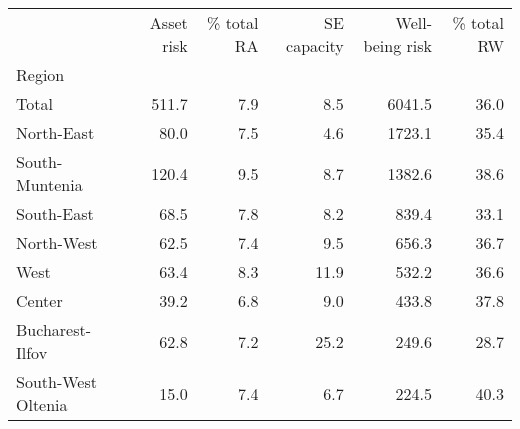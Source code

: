 \begin{tabular}{lrrrrr}
\toprule
{} &  Asset risk &  \% total RA &  SE capacity &  Well-being risk &  \% total RW \\
Region             &             &             &              &                  &             \\
\midrule
Total              &       511.7 &         7.9 &          8.5 &           6041.5 &        36.0 \\
North-East         &        80.0 &         7.5 &          4.6 &           1723.1 &        35.4 \\
South-Muntenia     &       120.4 &         9.5 &          8.7 &           1382.6 &        38.6 \\
South-East         &        68.5 &         7.8 &          8.2 &            839.4 &        33.1 \\
North-West         &        62.5 &         7.4 &          9.5 &            656.3 &        36.7 \\
West               &        63.4 &         8.3 &         11.9 &            532.2 &        36.6 \\
Center             &        39.2 &         6.8 &          9.0 &            433.8 &        37.8 \\
Bucharest-Ilfov    &        62.8 &         7.2 &         25.2 &            249.6 &        28.7 \\
South-West Oltenia &        15.0 &         7.4 &          6.7 &            224.5 &        40.3 \\
\bottomrule
\end{tabular}
